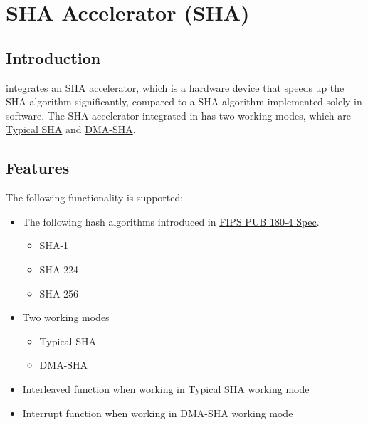 \documentclass[main\_\_EN.tex]{subfiles}
\begin{document}

\ifglobal
\else
    {\let\clearpage\relax \listoftodos}
    {\let\clearpage\relax \listofdonetodos}
    \tableofcontents
\fi


\hypertarget{sha}{}
\chapter{SHA Accelerator (SHA)}
\label{mod:sha}
\section{Introduction}

\chipname{} integrates an SHA accelerator, which is a hardware device that speeds up the SHA algorithm significantly, compared to a SHA algorithm implemented solely in software. The SHA accelerator integrated in \chipname{} has two working modes, which are  \hyperref[sec:sha-typical-sha]{Typical SHA} and  \hyperref[sec:sha-dma-sha]{DMA-SHA}.

\section{Features}

The following functionality is supported:

\begin{itemize}
    \item The following hash algorithms introduced in   \href{https://doi.org/10.6028/NIST.FIPS.180-4}{FIPS PUB 180-4 Spec}.
    \begin{itemize}
        \item SHA-1
        \item SHA-224
        \item SHA-256
    \end{itemize}
    \item Two working modes
    \begin{itemize}
        \item Typical SHA
        \item DMA-SHA
    \end{itemize}
    \item Interleaved function when working in Typical SHA working mode
    \item Interrupt function when working in DMA-SHA working mode
\end{itemize}
\end{document}

